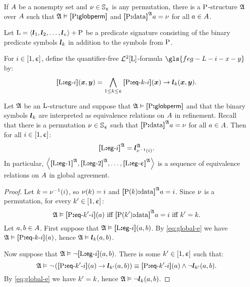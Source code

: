 If $A$ be a nonempty set and $\nu \in \mathbb{S}_{\upepsilon}$ is any permutation,
there is a $\mathrm{P}$-structure $\mathfrak{A}$ over $A$ such that
$\mathfrak{A} \vDash {\bm{[}\mathrm{P}\mathord{\bm{:}}\mathsf{globperm}\bm{]}}$ and ${\bm{[}\mathrm{P}\mathord{\bm{:}}\mathrm{data}\bm{]}}^{\mathfrak{A}}a = \nu$ for all 
$a \in A$.

Let $\mathrm{L} = \left\langle \bm{l}_{1}, \bm{l}_{2}, \dots, \bm{l}_{\upepsilon} \right\rangle + \mathrm{P}$ be a predicate
signature consisting of the binary predicate symbols $\bm{l}_{k}$ in addition to
the symbols from $\mathrm{P}$.

\begin{definition}
For $i \in [1, \upepsilon]$, define the quantifier-free $\mathcal{L}^{2}[\mathrm{L}]$-formula
$\gls{feg-L-i-x-y}$ by:
\[
  {\bm{[}\mathrm{L}\mathord{\bm{:}}\mathsf{eg}{\hbox{-}}i\bm{]}}(\bm{x},\bm{y}) = \bigwedge_{1 \leq k \leq \upepsilon}
  {\bm{[}\mathrm{P}\mathord{\bm{:}}\mathsf{eq}{\hbox{-}}k{\hbox{-}}i\bm{]}}(\bm{x}) \rightarrow \bm{l}_{k}(\bm{x}, \bm{y}).
\]
\end{definition}
\begin{remark}\label{rem:global-e-m}
Let $\mathfrak{A}$ be an $\mathrm{L}$-structure and suppose that 
$\mathfrak{A} \vDash {\bm{[}\mathrm{P}\mathord{\bm{:}}\mathsf{globperm}\bm{]}}$
and that the binary symbols $\bm{l}_{k}$ are interpreted as equivalence relations
on $A$ in refinement.
Recall that there is a permutation $\nu \in \mathbb{S}_{\upepsilon}$ such that
${\bm{[}\mathrm{P}\mathord{\bm{:}}\mathrm{data}\bm{]}}^{\mathfrak{A}}a =\nu$ for all $a \in A$.
Then for all $i \in [1, \upepsilon]$:
\[
  {\bm{[}\mathrm{L}\mathord{\bm{:}}\mathsf{eg}{\hbox{-}}i\bm{]}}^{\mathfrak{A}} = \bm{l}_{\nu^{-1}(i)}^{\mathfrak{A}}.
\]
In particular,
$\left\langle {\bm{[}\mathrm{L}\mathord{\bm{:}}\mathsf{eg}{\hbox{-}}1\bm{]}}^{\mathfrak{A}}, {\bm{[}\mathrm{L}\mathord{\bm{:}}\mathsf{eg}{\hbox{-}}2\bm{]}}^{\mathfrak{A}}, \dots, {\bm{[}\mathrm{L}\mathord{\bm{:}}\mathsf{eg}{\hbox{-}}\upepsilon\bm{]}}^{\mathfrak{A}} \right\rangle$ is
a sequence of equivalence relations on $A$ in global agreement.
\end{remark}
\begin{proof}
Let $k = \nu^{-1}(i)$, so $\nu(k) = i$ and
${\bm{[}\mathrm{P}(k)\mathord{\bm{:}}\mathrm{data}\bm{]}}^{\mathfrak{A}}a = i$.
Since $\nu$ is a permutation, for every ${k'} \in [1, \upepsilon]$:
\begin{equation}\label{eq:global-e}
\mifff{
  \StrA \vDash \feqAA\PS\kkp\ii(\ea)}{
  \data{\PSp\kkp}\StrA\ea = \ii}{
  \kkp = \kk}.
\end{equation}
Let $a, b \in A$.
First suppose that $\mathfrak{A} \vDash {\bm{[}\mathrm{L}\mathord{\bm{:}}\mathsf{eg}{\hbox{-}}i\bm{]}}(a,b)$.
By \cref{eq:global-e} we have $\mathfrak{A} \vDash {\bm{[}\mathrm{P}\mathord{\bm{:}}\mathsf{eq}{\hbox{-}}k{\hbox{-}}i\bm{]}}(a)$, hence
$\mathfrak{A} \vDash \bm{l}_{k}(a,b)$.

Now suppose that $\mathfrak{A} \vDash \lnot{\bm{[}\mathrm{L}\mathord{\bm{:}}\mathsf{eg}{\hbox{-}}i\bm{]}}(a,b)$. There is some
${k'} \in [1, \upepsilon]$ such that:
\[
  \mathfrak{A} \vDash \lnot\left({\bm{[}\mathrm{P}\mathord{\bm{:}}\mathsf{eq}{\hbox{-}}{k'}{\hbox{-}}i\bm{]}}(a) \rightarrow \bm{l}_{{k'}}(a,b)\right)
  \equiv {\bm{[}\mathrm{P}\mathord{\bm{:}}\mathsf{eq}{\hbox{-}}{k'}{\hbox{-}}i\bm{]}}(a) \land \lnot\bm{l}_{{k'}}(a,b).
\]
By \cref{eq:global-e} we have ${k'} = k$, hence
$\mathfrak{A} \vDash \lnot\bm{l}_{k}(a,b)$.
\end{proof}

